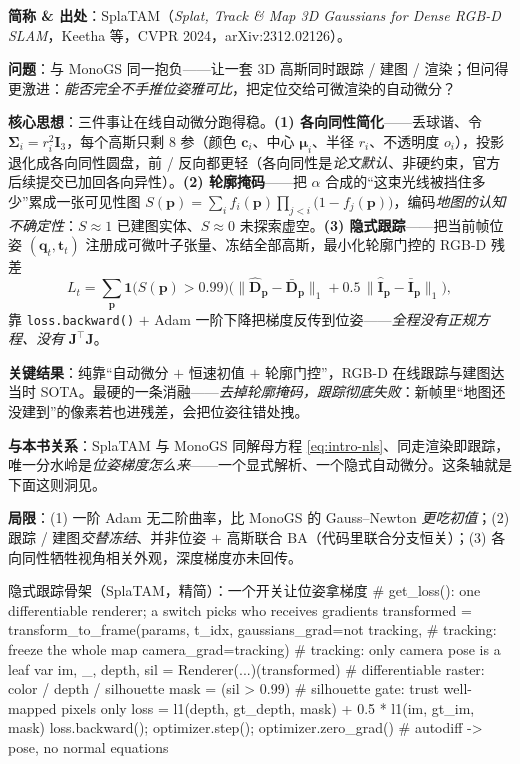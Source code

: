 \begin{paper}
\textbf{简称 \& 出处}：SplaTAM（\emph{Splat, Track \& Map 3D Gaussians for Dense RGB-D SLAM}，Keetha 等，CVPR 2024，arXiv:2312.02126）\cite{keetha2024splatam}。

\textbf{问题}：与 MonoGS 同一抱负——让一套 3D 高斯同时跟踪 / 建图 / 渲染；但问得更激进：\emph{能否完全不手推位姿雅可比}，把定位交给可微渲染的自动微分？

\textbf{核心思想}：三件事让在线自动微分跑得稳。\textbf{(1) 各向同性简化}——丢球谐、令 $\boldsymbol\Sigma_i=r_i^2\mathbf I_3$，每个高斯只剩 $8$ 参（颜色 $\mathbf c_i$、中心 $\boldsymbol\mu_i$、半径 $r_i$、不透明度 $o_i$），投影退化成各向同性圆盘，前 / 反向都更轻（各向同性是\emph{论文默认}、非硬约束，官方后续提交已加回各向异性）。\textbf{(2) 轮廓掩码}——把 $\alpha$ 合成的“这束光线被挡住多少”累成一张可见性图 $S(\mathbf p)=\sum_i f_i(\mathbf p)\prod_{j<i}\big(1-f_j(\mathbf p)\big)$，编码\emph{地图的认知不确定性}：$S\!\approx\!1$ 已建图实体、$S\!\approx\!0$ 未探索虚空。\textbf{(3) 隐式跟踪}——把当前帧位姿 $(\mathbf q_t,\mathbf t_t)$ 注册成可微叶子张量、冻结全部高斯，最小化轮廓门控的 RGB-D 残差
\[
L_t=\sum_{\mathbf p}\mathbf 1\!\big(S(\mathbf p)>0.99\big)\Big(\lVert\hat{\mathbf D}_{\mathbf p}-\bar{\mathbf D}_{\mathbf p}\rVert_1+0.5\,\lVert\hat{\mathbf I}_{\mathbf p}-\bar{\mathbf I}_{\mathbf p}\rVert_1\Big),
\]
靠 \texttt{loss.backward()} $+$ Adam 一阶下降把梯度反传到位姿——\emph{全程没有正规方程、没有} $\mathbf J^\top\mathbf J$。

\textbf{关键结果}：纯靠“自动微分 $+$ 恒速初值 $+$ 轮廓门控”，RGB-D 在线跟踪与建图达当时 SOTA。最硬的一条消融——\emph{去掉轮廓掩码，跟踪彻底失败}：新帧里“地图还没建到”的像素若也进残差，会把位姿往错处拽。

\textbf{与本书关系}：SplaTAM 与 MonoGS 同解母方程 \cref{eq:intro-nls}、同走渲染即跟踪，唯一分水岭是\emph{位姿梯度怎么来}——一个显式解析、一个隐式自动微分。这条轴就是下面这则洞见。

\textbf{局限}：(1) 一阶 Adam 无二阶曲率，比 MonoGS 的 Gauss--Newton \emph{更吃初值}；(2) 跟踪 / 建图\emph{交替冻结}、并非位姿 $+$ 高斯联合 BA（代码里联合分支恒关）；(3) 各向同性牺牲视角相关外观，深度梯度亦未回传。
\end{paper}

\begin{codebox}[Python]{隐式跟踪骨架（SplaTAM，精简）：一个开关让位姿拿梯度}
# get_loss(): one differentiable renderer; a switch picks who receives gradients
transformed = transform_to_frame(params, t_idx,
                gaussians_grad=not tracking,   # tracking: freeze the whole map
                camera_grad=tracking)          # tracking: only camera pose is a leaf var
im, _, depth, sil = Renderer(...)(transformed) # differentiable raster: color / depth / silhouette
mask = (sil > 0.99)                             # silhouette gate: trust well-mapped pixels only
loss = l1(depth, gt_depth, mask) + 0.5 * l1(im, gt_im, mask)
loss.backward(); optimizer.step(); optimizer.zero_grad()   # autodiff -> pose, no normal equations
\end{codebox}

